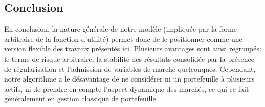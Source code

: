 \subsection{Conclusion}


En conclusion, la nature générale de notre modèle (impliquée par la forme arbitraire de la
fonction d'utilité) permet donc de le positionner comme une version flexible des travaux
présentés ici. Plusieurs avantages sont ainsi regroupés: le terme de risque arbitraire, la
stabilité des résultats consolidée par la présence de régularisation et l'admission de
variables de marché quelconques. Cependant, notre algorithme a le désavantage de ne
considérer ni un portefeuille à plusieurs actifs, ni de prendre en compte l'aspect
dynamique des marchés, ce qui ce fait généralement en gestion classique de portefeuille.


